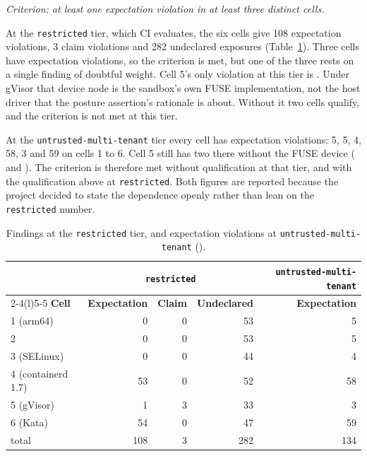 \emph{Criterion: at least one expectation violation in at least three distinct cells.}

At the \texttt{restricted} tier, which CI evaluates, the six cells give 108 expectation violations, 3 claim violations and 282 undeclared exposures (Table~\ref{tab:findings}). Three cells have expectation violations, so the criterion is met, but one of the three rests on a single finding of doubtful weight. Cell 5's only violation at this tier is . Under gVisor that device node is the sandbox's own FUSE implementation, not the host driver that the posture assertion's rationale is about. Without it two cells qualify, and the criterion is not met at this tier.

At the \texttt{untrusted-multi-tenant} tier every cell has expectation violations: 5, 5, 4, 58, 3 and 59 on cells 1 to 6. Cell 5 still has two there without the FUSE device ( and ). The criterion is therefore met without qualification at that tier, and with the qualification above at \texttt{restricted}. Both figures are reported because the project decided to state the dependence openly rather than lean on the \texttt{restricted} number.

\begin{table}[htbp]
\centering\small
\begin{tabular}{@{}lrrrr@{}}
\toprule
& \multicolumn{3}{c}{\textbf{\texttt{restricted}}} & \textbf{\texttt{untrusted-multi-tenant}} \\
\cmidrule(lr){2-4}\cmidrule(l){5-5}
\textbf{Cell} & \textbf{Expectation} & \textbf{Claim} & \textbf{Undeclared} & \textbf{Expectation} \\
\midrule
1 (arm64) & 0 & 0 & 53 & 5 \\
2 & 0 & 0 & 53 & 5 \\
3 (SELinux) & 0 & 0 & 44 & 4 \\
4 (containerd 1.7) & 53 & 0 & 52 & 58 \\
5 (gVisor) & 1 & 3 & 33 & 3 \\
6 (Kata) & 54 & 0 & 47 & 59 \\
\midrule
total & 108 & 3 & 282 & 134 \\
\bottomrule
\end{tabular}
\caption{Findings at the \texttt{restricted} tier, and expectation violations at \texttt{untrusted-multi-tenant} ().}
\label{tab:findings}
\end{table}

